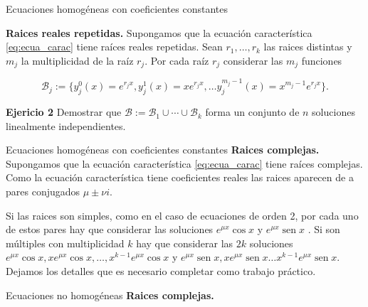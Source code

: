 \documentclass[handout,hyperref={colorlinks=true}]{beamer}
\DeclareMathOperator{\sen}{sen}
\begin{document}
\begin{frame}{Ecuaciones homogéneas con coeficientes constantes}

\textbf{Raices reales repetidas.}
Supongamos que la ecuación característica \eqref{eq:ecua_carac} tiene  raíces reales repetidas. Sean $r_1,\ldots,r_k$ las raices distintas y $m_j$ la multiplicidad de la raíz $r_j$. Por cada raíz $r_j$ considerar las $m_j$  funciones

\[\mathcal{B}_j:=\{y_j^0(x)=e^{r_jx}, y_j^1(x)=xe^{r_jx},\ldots y_j^{m_j-1}(x)=x^{m_j-1}e^{r_jx}\}.\]

 \textbf{Ejericio 2} Demostrar que $\mathcal{B}:=\mathcal{B}_1\cup\cdots\cup \mathcal{B}_k$ forma
 un conjunto de  $n$  soluciones linealmente independientes. 

\end{frame}

\begin{frame}{Ecuaciones homogéneas con coeficientes constantes}
\textbf{Raices complejas.}
Supongamos que la ecuación característica \eqref{eq:ecua_carac} tiene  raíces complejas. Como la ecuación característica tiene coeficientes reales las raices aparecen de a pares conjugados $\mu\pm\nu i$. 

Si las raices son simples, como en el caso de ecuaciones de orden 2, por cada uno de estos pares hay que considerar las soluciones $ e^{\mu x}\cos x$ y $e^{\mu x}\sen x$ . Si son múltiples con multiplicidad $k$ hay que considerar las $2k$ soluciones   $ e^{\mu x}\cos x, xe^{\mu x}\cos x,\ldots, x^{k-1}e^{\mu x}\cos x$ y $e^{\mu x}\sen x,xe^{\mu x}\sen x\ldots x^{k-1}e^{\mu x}\sen x $. Dejamos los detalles que es necesario completar como trabajo práctico.
 
\end{frame}



\begin{frame}{Ecuaciones no homogéneas}
\textbf{Raices complejas.}

 
\end{frame}
\end{document}
